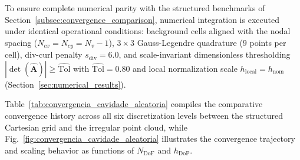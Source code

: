\documentclass[preprint,12pt]{elsarticle}
\begin{document}
To ensure complete numerical parity with the structured benchmarks of Section~\ref{subsec:convergence_comparison}, numerical integration is executed under identical operational conditions: background cells aligned with the nodal spacing ($N_{cx} = N_{cy} = N_v - 1$), $3 \times 3$ Gauss-Legendre quadrature ($9$ points per cell), div-curl penalty $s_{\mathrm{div}} = 6.0$, and scale-invariant dimensionless thresholding $|\det(\widehat{\mathbf{A}})| \ge \widehat{\mathrm{Tol}}$ with $\widehat{\mathrm{Tol}} = 0.80$ and local normalization scale $h_{\mathrm{local}} = h_{\mathrm{nom}}$ (Section~\ref{sec:numerical_results}).

Table~\ref{tab:convergencia_cavidade_aleatoria} compiles the comparative convergence history across all six discretization levels between the structured Cartesian grid and the irregular point cloud, while Fig.~\ref{fig:convergencia_cavidade_aleatoria} illustrates the convergence trajectory and scaling behavior as functions of $N_{\mathrm{DoF}}$ and $h_{\mathrm{DoF}}$.
\end{document}
